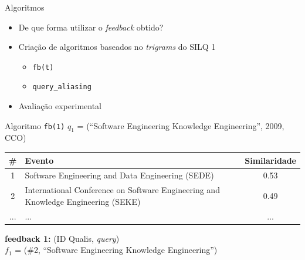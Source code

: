 \documentclass{beamer}
\newcommand{\quotes}[1]{``#1''}
\begin{document}
\begin{frame}{Algoritmos}
  \begin{itemize}
    \item De que forma utilizar o \textit{feedback} obtido?
    \item Criação de algoritmos baseados no \textit{trigrams} do SILQ 1
    \begin{itemize}
      \item \texttt{fb(t)}
      \item \texttt{query\_aliasing}
    \end{itemize}
    \item Avaliação experimental
  \end{itemize}
\end{frame}

\begin{frame}{Algoritmo \texttt{fb(1)}}
  $q_1$ = (\quotes{Software Engineering Knowledge Engineering}, 2009, CCO)\\

  \pause
  \small
  \begin{table}[!h]
    \begin{tabular}{ c | p{7cm} | c }
      \textbf{\#} & \textbf{Evento} & \textbf{Similaridade} \\ \hline
      \hline

      1 & Software Engineering and Data Engineering (SEDE) & 0.53 \\ \hline
      2 & International Conference on Software Engineering and Knowledge Engineering (SEKE) & 0.49 \\ \hline
      ... & ... & ...
    \end{tabular}
  \end{table}

  \pause
  \textbf{feedback 1:} (ID Qualis, \textit{query})\\
  $f_1$ = (\#2, \quotes{Software Engineering Knowledge Engineering})
\end{frame}
\end{document}
